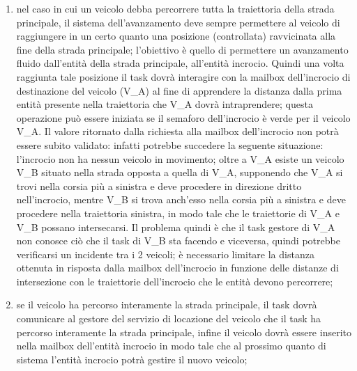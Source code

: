 \begin{enumerate}
\begin{enumerate}
\item nel caso in cui un veicolo debba percorrere tutta la traiettoria della strada principale, il sistema dell'avanzamento deve sempre permettere al veicolo di raggiungere in un certo quanto una posizione (controllata) ravvicinata alla fine della strada principale; l'obiettivo è quello di permettere un avanzamento fluido dall'entità della strada principale, all'entità incrocio. Quindi una volta raggiunta tale posizione il task dovrà interagire con la mailbox dell'incrocio di destinazione del veicolo (V\_A) al fine di apprendere la distanza dalla prima entità presente nella traiettoria che V\_A dovrà intraprendere; questa operazione può essere iniziata se il semaforo dell'incrocio è verde per il veicolo V\_A. Il valore ritornato dalla richiesta alla mailbox dell'incrocio non potrà essere subito validato: infatti potrebbe succedere la seguente situazione: l'incrocio non ha nessun veicolo in movimento; oltre a V\_A esiste un veicolo V\_B situato nella strada opposta a quella di V\_A, supponendo che V\_A si trovi nella corsia più a sinistra e deve procedere in direzione dritto nell'incrocio, mentre V\_B si trova anch'esso nella corsia più a sinistra e deve procedere nella traiettoria sinistra, in modo tale che le traiettorie di V\_A e V\_B possano intersecarsi. Il problema quindi è che il task gestore di V\_A non conosce ciò che il task di V\_B sta facendo e viceversa, quindi potrebbe verificarsi un incidente tra i 2 veicoli; è necessario limitare la distanza ottenuta in risposta dalla mailbox dell'incrocio in funzione delle distanze di intersezione con le traiettorie dell'incrocio che le entità devono percorrere;
\item se il veicolo ha percorso interamente la strada principale, il task dovrà comunicare al gestore del servizio di locazione del veicolo che il task ha percorso interamente la strada principale, infine il veicolo dovrà essere inserito nella mailbox dell'entità incrocio in modo tale che al prossimo quanto di sistema l'entità incrocio potrà gestire il nuovo veicolo;

\end{enumerate}
\end{enumerate}

